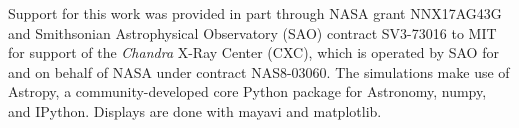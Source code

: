 \documentclass[]{spie}  %
\begin{document}
\acknowledgments %
Support for this work was provided in part through NASA grant NNX17AG43G and Smithsonian Astrophysical Observatory (SAO)
contract SV3-73016 to MIT for support of the {\em Chandra} X-Ray Center (CXC),
which is operated by SAO for and on behalf of NASA under contract NAS8-03060.
The simulations make use of Astropy, a community-developed core Python package
for Astronomy\cite{astropy1,astropy2}, numpy\cite{numpy}, and
IPython\cite{IPython}. Displays are done with mayavi\cite{mayavi} and matplotlib\cite{matplotlib}.


\end{document}

